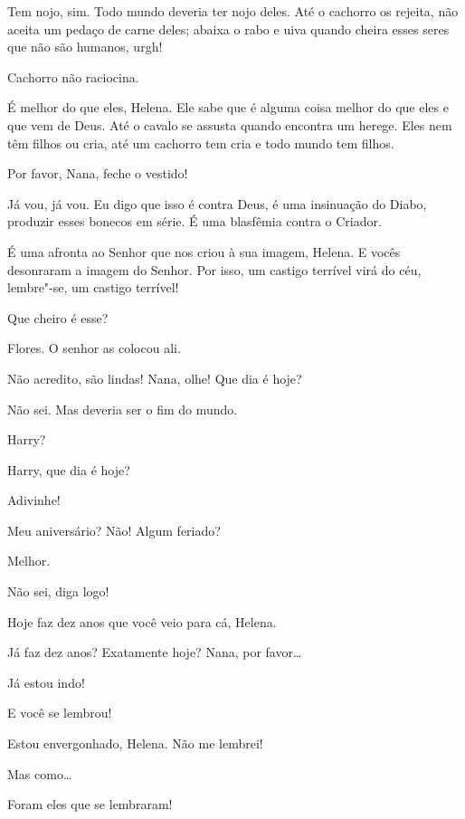  Tem nojo, sim. Todo mundo deveria ter nojo deles. Até o cachorro os
rejeita, não aceita um pedaço de carne deles; abaixa o rabo e uiva quando
cheira esses seres que não são humanos, urgh!

 Cachorro não raciocina.

 É melhor do que eles, Helena. Ele sabe que é alguma coisa melhor do que
eles e que vem de Deus. Até o cavalo se assusta quando encontra um herege.
Eles nem têm filhos ou cria, até um cachorro tem cria e todo mundo tem filhos.

 Por favor, Nana, feche o vestido!

 Já vou, já vou. Eu digo que isso é contra Deus, é uma insinuação do Diabo,
produzir esses bonecos em série. É uma blasfêmia contra o Criador.

 É uma afronta ao Senhor que nos criou à sua imagem,
Helena. E vocês desonraram a imagem do Senhor. Por isso, um castigo terrível
virá do céu, lembre"-se, um castigo terrível!

 Que cheiro é esse?

 Flores. O senhor as colocou ali.

 Não acredito, são lindas! Nana, olhe! Que dia é hoje?

 Não sei. Mas deveria ser o fim do mundo.

 Harry?

 Harry, que dia é hoje?

 Adivinhe!

 Meu aniversário? Não! Algum feriado?

 Melhor.

 Não sei, diga logo!

 Hoje faz dez anos que você veio para cá, Helena.

 Já faz dez anos? Exatamente hoje? Nana, por favor\ldots{}

 Já estou indo! 

  E você se lembrou!

 Estou envergonhado, Helena. Não me lembrei!

 Mas como\ldots{}

 Foram eles que se lembraram!

